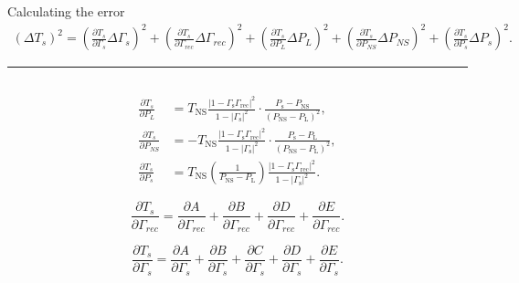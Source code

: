 \documentclass[aspectratio=169]{beamer}
\begin{document}
\begin{frame}{\small{Calculating the error}}
	\vfill
	{\tiny
		\begin{multline}
			(\Delta T_s)^2 =
			\left(\frac{\partial T_s}{\partial \Gamma_s} \Delta \Gamma_s\right)^2 +
			\left(\frac{\partial T_s}{\partial \Gamma_{rec}} \Delta \Gamma_{rec}\right)^2 +
			\left(\frac{\partial T_s}{\partial P_L} \Delta P_L\right)^2 +
			\left(\frac{\partial T_s}{\partial P_{NS}} \Delta P_{NS}\right)^2 +
			\left(\frac{\partial T_s}{\partial P_s} \Delta P_s\right)^2.
		\end{multline}
	}

	\hrule

	\begin{columns}[c] %
		\begin{column}{0.4\textwidth}
			\centering
			{\tiny
				\begin{align}
					\frac{\partial T_s}{\partial P_L}    & = T_\mathrm{NS} \frac{\left|1 - \Gamma_\mathrm{s} \Gamma_\mathrm{rec}\right|^2}{1 - |\Gamma_\mathrm{s}|^2} \cdot \frac{P_\mathrm{s} - P_\mathrm{NS}}{(P_\mathrm{NS} - P_\mathrm{L})^2}, \\
					\frac{\partial T_s}{\partial P_{NS}} & = -T_\mathrm{NS} \frac{\left|1 - \Gamma_\mathrm{s} \Gamma_\mathrm{rec}\right|^2}{1 - |\Gamma_\mathrm{s}|^2} \cdot \frac{P_\mathrm{s} - P_\mathrm{L}}{(P_\mathrm{NS} - P_\mathrm{L})^2}, \\
					\frac{\partial T_s}{\partial P_s}    & = T_\mathrm{NS} \left(\frac{1}{P_\mathrm{NS}-P_\mathrm{L}}\right) \frac{\left|1-\Gamma_\mathrm{s}\Gamma_\mathrm{rec}\right|^2}{ 1-|\Gamma_\mathrm{s}|^2}.
				\end{align}

				\begin{equation}
					\frac{\partial T_s}{\partial \Gamma_{rec}} = \frac{\partial A}{\partial \Gamma_{rec}} + \frac{\partial B}{\partial \Gamma_{rec}} + \frac{\partial D}{\partial \Gamma_{rec}} + \frac{\partial E}{\partial \Gamma_{rec}}.
				\end{equation}

				\begin{equation}
					\frac{\partial T_s}{\partial \Gamma_s} = \frac{\partial A}{\partial \Gamma_s} + \frac{\partial B}{\partial \Gamma_s} + \frac{\partial C}{\partial \Gamma_s} + \frac{\partial D}{\partial \Gamma_s} + \frac{\partial E}{\partial \Gamma_s}.
				\end{equation}
			}
		\end{column}


\end{columns}
\end{frame}
\end{document}
